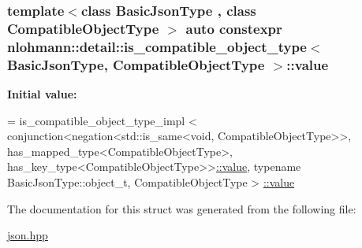 \subsubsection[{\texorpdfstring{value}{value}}]{\setlength{\rightskip}{0pt plus 5cm}template$<$class Basic\+Json\+Type , class Compatible\+Object\+Type $>$ auto constexpr {\bf nlohmann\+::detail\+::is\+\_\+compatible\+\_\+object\+\_\+type}$<$ Basic\+Json\+Type, Compatible\+Object\+Type $>$\+::value\hspace{0.3cm}{\ttfamily [static]}}\hypertarget{structnlohmann_1_1detail_1_1is__compatible__object__type_a87cce7bcdcd22cc8517f171705f6a7c7}{}\label{structnlohmann_1_1detail_1_1is__compatible__object__type_a87cce7bcdcd22cc8517f171705f6a7c7}
{\bfseries Initial value\+:}
\begin{DoxyCode}
= is\_compatible\_object\_type\_impl <
                                  conjunction<negation<std::is\_same<void, CompatibleObjectType>>,
                                  has\_mapped\_type<CompatibleObjectType>,
                                  has\_key\_type<CompatibleObjectType>>\hyperlink{structnlohmann_1_1detail_1_1is__compatible__object__type_a87cce7bcdcd22cc8517f171705f6a7c7}{::value},
                                  \textcolor{keyword}{typename} BasicJsonType::object\_t, CompatibleObjectType >
      \hyperlink{structnlohmann_1_1detail_1_1is__compatible__object__type_a87cce7bcdcd22cc8517f171705f6a7c7}{::value}
\end{DoxyCode}


The documentation for this struct was generated from the following file\+:\begin{DoxyCompactItemize}
\item 
\hyperlink{json_8hpp}{json.\+hpp}\end{DoxyCompactItemize}
